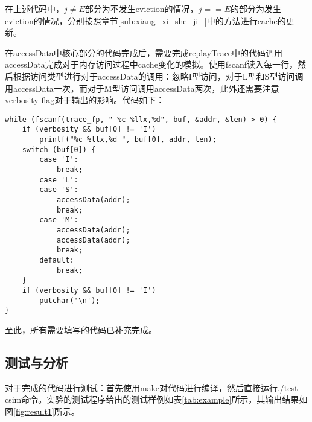 \par 在上述代码中，$j\neq E$部分为不发生eviction的情况，$j==E$的部分为发生eviction的情况，分别按照章节\ref{sub:xiang_xi_she_ji_}中的方法进行cache的更新。

\par 在accessData中核心部分的代码完成后，需要完成replayTrace中的代码调用accessData完成对于内存访问过程中cache变化的模拟。使用fscanf读入每一行，然后根据访问类型进行对于accessData的调用：忽略I型访问，对于L型和S型访问调用accessData一次，而对于M型访问调用accessData两次，此外还需要注意verbosity flag对于输出的影响。代码如下：
\begin{lstlisting}
while (fscanf(trace_fp, " %c %llx,%d", buf, &addr, &len) > 0) {
    if (verbosity && buf[0] != 'I')
        printf("%c %llx,%d ", buf[0], addr, len);
    switch (buf[0]) {
        case 'I':
            break;
        case 'L':
        case 'S':
            accessData(addr);
            break;
        case 'M':
            accessData(addr);
            accessData(addr);
            break;
        default:
            break;
    }
    if (verbosity && buf[0] != 'I')
        putchar('\n');
}
\end{lstlisting}

\par 至此，所有需要填写的代码已补充完成。

\subsection{测试与分析}
\label{sub:jie_guo_fen_xi_}

\par 对于完成的代码进行测试：首先使用make对代码进行编译，然后直接运行./test-csim命令。实验的测试程序给出的测试样例如表\ref{tab:example}所示，其输出结果如图\ref{fig:result1}所示。

